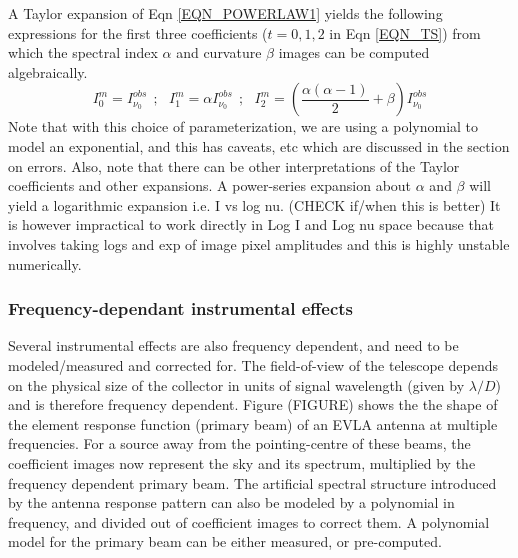 \documentclass[structabstract]{aa}
\begin{document}
A Taylor expansion of Eqn \ref{EQN_POWERLAW1} yields the following expressions for the first
three coefficients ($t=0,1,2$ in Eqn \ref{EQN_TS}) from which the spectral index $\alpha$ and curvature $\beta$ images 
can be computed algebraically.
\begin{equation}
I^m_0 = I^{obs}_{\nu_0} ~~;~~~ I^m_1 = \alpha I^{obs}_{\nu_0} ~~;~~~ I^m_2 = \left(\frac{\alpha(\alpha-1)}{2} + \beta\right) I^{obs}_{\nu_0}
\label{EQN_COEFFS}
\end{equation}
Note that with this choice of parameterization, 
we are using a polynomial to model an exponential, and this has caveats, etc which
are discussed in the section on errors.
Also, note that there can be other interpretations of the Taylor coefficients %
and other expansions. 
A power-series expansion about $\alpha$ and $\beta$ will yield a logarithmic
expansion i.e. I vs log nu. (CHECK if/when this is better)
It is however impractical to work directly in Log I and Log nu space because that
involves taking logs and exp of image pixel amplitudes and this is highly unstable numerically.


\subsubsection{Frequency-dependant instrumental effects}
Several instrumental effects are also frequency dependent, and need to be modeled/measured and
corrected for.
The field-of-view of the telescope depends on the physical size of the collector
in units of signal wavelength
(given by $\lambda/D$) and is therefore frequency dependent. Figure (FIGURE) shows the
the shape of the element response function (primary beam) of an EVLA antenna at multiple
frequencies. 
For a source away from the pointing-centre of these beams, the coefficient images now 
represent the sky and its spectrum, multiplied by the frequency dependent primary beam.  
The artificial spectral structure introduced by the antenna response pattern can also be
modeled by a polynomial in frequency, and divided out of coefficient images to correct 
them. A polynomial model for the primary beam can be either measured, or pre-computed.
\end{document}
